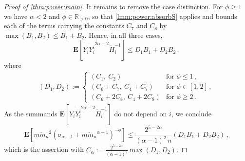 \documentclass{article}
\newcommand{\R}{\mathbb{R}}
\newcommand{\Rpp}{\R_{>0}}
\newcommand{\lab}{\left[} %
\newcommand{\rab}{\right]} %
\newcommand{\ab}[1]{\lab #1 \rab} %
\newcommand{\abOf}[1]{\!\ab{#1}} %
\newcommand{\lb}{\left(} %
\newcommand{\rb}{\right)} %
\newcommand{\br}[1]{\lb #1 \rb} %
\newcommand{\E}{\mathbf{E}} %
\newcommand{\Eof}[1]{\E[#1]}
\newcommand{\EOf}[1]{\E\abOf{#1}}
\newcommand{\eqcm}{\,,} %
\newcommand{\eqfs}{\,.}
\newcommand{\ol}[2]{\overline{#1#2}}
\begin{document}
\begin{proof}[Proof of \cref{thm:power:main}]
    It remains to remove the case distinction.
    For $\phi\geq1$ we have $\alpha<2$ and $\phi\in\Rpp$, so that \cref{lmm:power:absorbS} applies and bounds each of the terms carrying the constants $C_7$ and $C_8$ by $\max(B_1, B_2) \leq B_1 + B_2$.
    Hence, in all three cases,
    \begin{equation}
        \EOf{\ol {Y_i}{Y_i^i}^{2\alpha-2}  \tilde H_i^{-1}} 
        \leq
        D_1 B_1 + D_2 B_2
        \eqcm
    \end{equation}
    where
    \begin{align}\label{eq:powerproof:final:d}
        \br{D_1, D_2} := \begin{cases}
            \br{C_1,\ C_2}
            & \text{for }
            \phi \leq 1
            \eqcm
            \\
            \br{C_6+C_7,\ C_4+C_7}
            & \text{for }
            \phi \in [1,2]
            \eqcm
            \\
            \br{C_6+2C_8,\ C_4+2C_8}
            & \text{for }
            \phi \geq 2
            \eqfs
        \end{cases}
    \end{align}
    As the summands $\Eof{\ol {Y_i}{Y_i^i}^{2\alpha-2}  \tilde H_i^{-1}}$ do not depend on $i$, we conclude
    \begin{equation}\label{eq:powerproof:final}
        \EOf{\ol{m}{m_n}^2 \br{\sigma_{\alpha-1} + \ol{m}{m_n}^{\alpha-1}}^{-\phi}}
        \leq
        \frac{2^{5-2\alpha}}{(\alpha-1)^2\,n} \br{D_1 B_1 + D_2 B_2}
        \eqcm
    \end{equation}
    which is the assertion with $C_\alpha := \frac{2^{5-2\alpha}}{(\alpha-1)^2} \max(D_1, D_2)$.
\end{proof}
%
%
%
\end{document}
